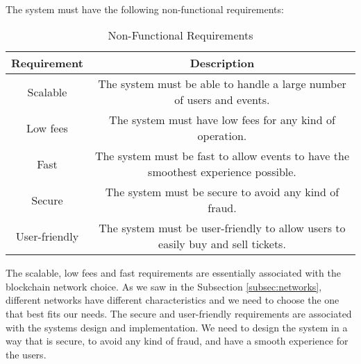 ~

The system must have the following non-functional requirements:

\begin{table}[H]
    \caption{Non-Functional Requirements}
    \label{tab:non_functional_requirements}
    \begin{tabular}{|c|c|}
        \hline
        \textbf{Requirement} & \textbf{Description}                                                               \\
        \hline
        Scalable             & The system must be able to handle a large number of users and events.              \\
        \hline
        Low fees             & The system must have low fees for any kind of operation.                           \\
        \hline
        Fast                 & The system must be fast to allow events to have the smoothest experience possible. \\
        \hline
        Secure               & The system must be secure to avoid any kind of fraud.                              \\
        \hline
        User-friendly        & The system must be user-friendly to allow users to easily buy and sell tickets.    \\
        \hline
    \end{tabular}
\end{table}

The scalable, low fees and fast requirements are essentially associated with the blockchain network choice. As we saw in the Subsection \ref{subsec:networks}, different networks have different characteristics and we need to choose the one that best fits our needs.
The secure and user-friendly requirements are associated with the systems design and implementation. We need to design the system in a way that is secure, to avoid any kind of fraud, and have a smooth experience for the users.
